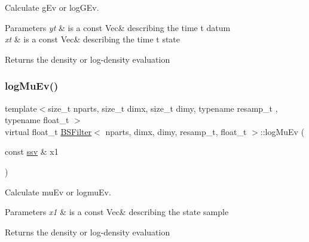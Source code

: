 Calculate g\+Ev or log\+G\+Ev. 


\begin{DoxyParams}{Parameters}
{\em yt} & is a const Vec\& describing the time t datum \\
\hline
{\em xt} & is a const Vec\& describing the time t state \\
\hline
\end{DoxyParams}
\begin{DoxyReturn}{Returns}
the density or log-\/density evaluation 
\end{DoxyReturn}
\mbox{\label{classBSFilter_ac219cb7510becb1be18dbb0b66b4c2c5}} 
\subsubsection{\texorpdfstring{log\+Mu\+Ev()}{logMuEv()}}
{\footnotesize\ttfamily template$<$size\+\_\+t nparts, size\+\_\+t dimx, size\+\_\+t dimy, typename resamp\+\_\+t , typename float\+\_\+t $>$ \\
virtual float\+\_\+t \hyperlink{classBSFilter}{B\+S\+Filter}$<$ nparts, dimx, dimy, resamp\+\_\+t, float\+\_\+t $>$\+::log\+Mu\+Ev (\begin{DoxyParamCaption}\item[{const \hyperlink{classBSFilter_a0b5bc93957fb6b6b1282f31fa2e01c3c}{ssv} \&}]{x1 }\end{DoxyParamCaption})\hspace{0.3cm}{\ttfamily [pure virtual]}}



Calculate mu\+Ev or logmu\+Ev. 


\begin{DoxyParams}{Parameters}
{\em x1} & is a const Vec\& describing the state sample \\
\hline
\end{DoxyParams}
\begin{DoxyReturn}{Returns}
the density or log-\/density evaluation 
\end{DoxyReturn}
\mbox{\label{classBSFilter_accd0c37510c408075939531766363390}} 
